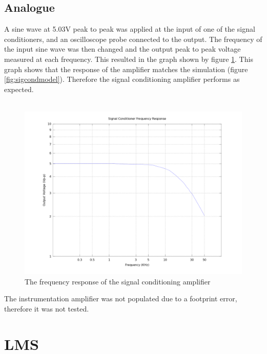 \subsection{Analogue}
A sine wave at 5.03V peak to peak was applied at the input of one of the signal conditioners, and an oscilloscope probe connected to the output.
The frequency of the input sine wave was then changed and the output peak to peak voltage measured at each frequency.
This resulted in the graph shown by figure \ref{fig:sigcondtest}.
This graph shows that the response of the amplifier matches the simulation (figure \ref{fig:sigcondmodel}).
Therefore the signal conditioning amplifier performs as expected.
\\
\\

\begin{figure}
	\centering
	\includegraphics[width=\textwidth]{./img/sigcondtest.png}
	\caption{The frequency response of the signal conditioning amplifier}
	\label{fig:sigcondtest}
\end{figure}

\noindent The instrumentation amplifier was not populated due to a footprint error, therefore it was not tested.

\section{LMS}
\label{ssec:testSWlms}
